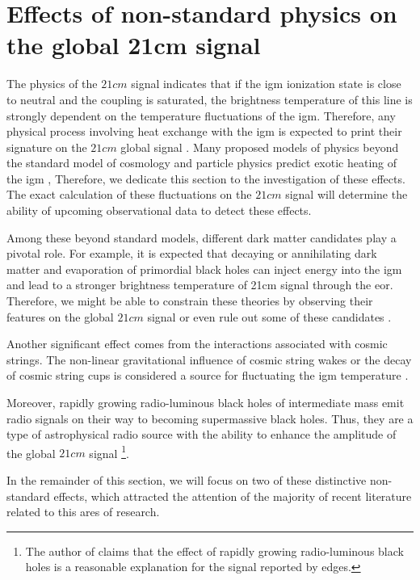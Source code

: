\documentclass[12pt, TexShade, letterpaper]{report}
\begin{document}
\section{Effects of non-standard physics on the global 21cm signal}
\label{chap:global21cm,sub:non_standard}
The physics of the $21cm$ signal indicates that if the \gls{igm} ionization state is close to neutral and the coupling is saturated, the brightness temperature of this line is strongly dependent on the temperature fluctuations of the \gls{igm}. Therefore, any physical process involving heat exchange with the \gls{igm} is expected to print their signature on the $21cm$ global signal \cite{21century}. Many proposed models of physics beyond the standard model of cosmology and particle physics predict exotic heating of the 
\gls{igm} \cite{21century}, Therefore, we dedicate this section to the investigation of these effects. The exact calculation of these fluctuations on the $21cm$ signal will determine the ability of upcoming observational data to detect these effects.\par
Among these beyond standard models, different dark matter candidates play a pivotal role. For example, it is expected that decaying or annihilating dark matter and evaporation of primordial black holes can inject energy into the \gls{igm} and lead to a stronger brightness temperature of 21cm signal through the \gls{eor}. Therefore, we might be able to constrain these theories by observing their features on the global $21cm$ signal \cite{primordial_bh, new_physics_thesis, primordial_bh_binary, 21limit_dm_bh, bound_dm} or even rule out some of these candidates \cite{rule_out}.\par
Another significant effect comes from the interactions associated with cosmic strings. The non-linear gravitational influence of cosmic string wakes or the decay of cosmic string cups is considered a source for fluctuating the \gls{igm} temperature \cite{WF_effect_oscar, cosmic_string_oscar, string_loop_robert}. \par
Moreover, rapidly growing radio-luminous black holes of intermediate mass emit radio signals on their way to becoming supermassive black holes. Thus, they are a type of astrophysical radio source with the ability to enhance the amplitude of the global $21cm$ signal \cite{bh_cosmioc_dawn} \footnote{The author of \cite{bh_cosmioc_dawn} claims that the effect of rapidly growing radio-luminous black holes is a reasonable explanation for the signal reported by \gls{edges}.}. \par
In the remainder of this section, we will focus on two of these distinctive non-standard effects, which attracted the attention of the majority of recent literature related to this ares of research.\par
\end{document}
